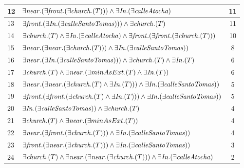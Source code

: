 \begin{table}[H]
\begin{center}
\begin{tabular}{|l|l|c|}
12&$\exists  \mathit{near}.(\exists \mathit{front}.(\exists \mathit{church}.(T))) \land \exists \mathit{In} .(\exists \mathit{calleAtocha})$ &11\\ \hline

13&$\exists \mathit{front}.(\exists \mathit{In} .(\exists \mathit{calleSantoTomas}))) \land \exists \mathit{church}.(T)$ &11\\ \hline

14&$\exists \mathit{church}.(T) \land \exists \mathit{In} .(\exists \mathit{calleAtocha}) \land \exists \mathit{front}.(\exists \mathit{front}.(\exists \mathit{church}.(T)))$ &10\\ \hline

15&$\exists  \mathit{near}.(\exists \mathit{near}.(\exists \mathit{church}.(T))) \land \exists \mathit{In} .(\exists \mathit{calleSantoTomas}))$ &8\\ \hline

16&$\exists  \mathit{near}.(\exists \mathit{In} .(\exists \mathit{calleSantoTomas}))) \land \exists \mathit{church}.(T) \land \exists \mathit{In} .(T)$ &6\\ \hline

17&$\exists \mathit{church}.(T) \land \exists \mathit{near} .(\exists minAsExt .(T) \land \exists \mathit{In} .(T))$ &6\\ \hline

18&$\exists  \mathit{near}.(\exists \mathit{near}.(\exists \mathit{church}.(T) \land \exists \mathit{In} .(T))) \land \exists \mathit{In} .(\exists \mathit{calleSantoTomas}))$ &5\\ \hline

19&$\exists \mathit{front}.(\exists \mathit{front}.(\exists \mathit{church}.(T) \land \exists \mathit{In} .(T))) \land \exists \mathit{In} .(\exists \mathit{calleSantoTomas}))$ &5\\ \hline

20&$\exists  \mathit{In} .(\exists \mathit{calleSantoTomas})) \land \exists \mathit{church}.(T)$ &4\\ \hline

21&$\exists \mathit{church}.(T) \land \exists \mathit{near} .(\exists minAsExt .(T))$ &4\\ \hline

22&$\exists  \mathit{near}.(\exists \mathit{front}.(\exists \mathit{church}.(T))) \land \exists \mathit{In} .(\exists \mathit{calleSantoTomas}))$ &4\\ \hline

23&$\exists \mathit{front}.(\exists \mathit{near}.(\exists \mathit{church}.(T))) \land \exists \mathit{In} .(\exists \mathit{calleSantoTomas}))$ &3\\ \hline

24&$\exists \mathit{church}.(T) \land \exists \mathit{near}.(\exists \mathit{near}.(\exists \mathit{church}.(T))) \land \exists \mathit{In} .(\exists \mathit{calleAtocha})$ &2\\ \hline


\end{tabular}
\end{center}
\end{table}
